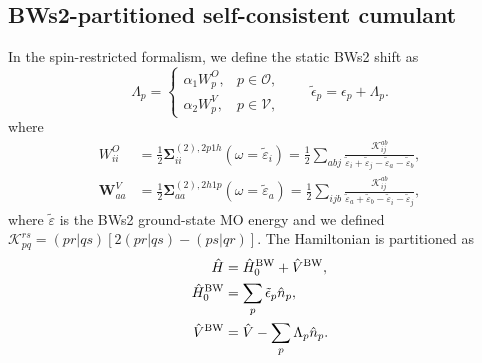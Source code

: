 \subsection{BWs2-partitioned self-consistent cumulant}
In the spin-restricted formalism,
we define the static BWs2 shift as
\begin{equation}
\Lambda_p
=
\begin{cases}
\alpha_1 W_p^{O}, & p\in\mathcal O,\\[1mm]
\alpha_2 W_p^{V}, & p\in\mathcal V,
\end{cases}
\qquad
\tilde{\epsilon}_p
=
\epsilon_p+\Lambda_p.
\end{equation}
where
\begin{align}
{W}^{O}_{ii} &= \frac{1}{2}\bm{\Sigma}_{ii}^{(2),2p1h}(\omega = \tilde{\varepsilon}_i)= \frac{1}{2}\sum_{a b j} \frac{\mathcal{K}_{ij}^{ab}}{\tilde{\varepsilon}_i + \tilde{\varepsilon}_j - \tilde{\varepsilon}_a - \tilde{\varepsilon}_b},\\
\mathbf{W}^{V}_{aa} &= \frac{1}{2}\bm{\Sigma}_{aa}^{(2),2h1p}(\omega = \tilde{\varepsilon}_a)= \frac{1}{2}\sum_{i j b} \frac{\mathcal{K}_{ij}^{ab}}{\tilde{\varepsilon}_a + \tilde{\varepsilon}_b - \tilde{\varepsilon}_i - \tilde{\varepsilon}_j},
\end{align}
where $\tilde{\varepsilon}$ is the BWs2 ground-state MO energy and we defined $\mathcal K_{pq}^{rs} =
(pr|qs)
\left[
2(pr|qs)-(ps|qr)
\right]$.
The Hamiltonian is partitioned as
\begin{align}
\hat H
&=
\hat H_0^{\rm BW}
+
\hat V^{\rm BW},\\
\hat H_0^{\rm BW}
&=
\sum_p
\tilde{\epsilon}_p\hat n_p,\\
\hat V^{\rm BW}
&=
\hat V
-
\sum_p
\Lambda_p\hat n_p .
\end{align}
